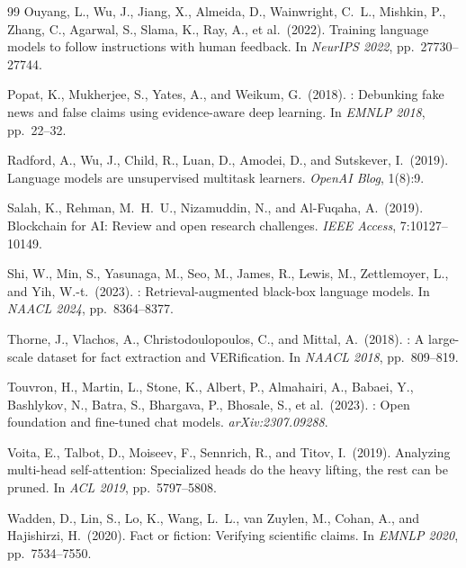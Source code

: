 \documentclass[11pt,a4paper]{article}
\begin{document}
\begin{thebibliography}{99}
Ouyang, L., Wu, J., Jiang, X., Almeida, D., Wainwright, C.~L., Mishkin, P.,
  Zhang, C., Agarwal, S., Slama, K., Ray, A., et al.\ (2022).
\newblock Training language models to follow instructions with human feedback.
\newblock In \textit{NeurIPS 2022}, pp.\ 27730--27744.

Popat, K., Mukherjee, S., Yates, A., and Weikum, G.\ (2018).
: Debunking fake news and false claims using evidence-aware
  deep learning.
\newblock In \textit{EMNLP 2018}, pp.\ 22--32.

Radford, A., Wu, J., Child, R., Luan, D., Amodei, D., and Sutskever, I.\ (2019).
\newblock Language models are unsupervised multitask learners.
\newblock \textit{OpenAI Blog}, 1(8):9.

Salah, K., Rehman, M.~H.~U., Nizamuddin, N., and Al-Fuqaha, A.\ (2019).
\newblock Blockchain for {AI}: Review and open research challenges.
\newblock \textit{IEEE Access}, 7:10127--10149.

Shi, W., Min, S., Yasunaga, M., Seo, M., James, R., Lewis, M., Zettlemoyer,
  L., and Yih, W.-t.\ (2023).
: Retrieval-augmented black-box language models.
\newblock In \textit{NAACL 2024}, pp.\ 8364--8377.

Thorne, J., Vlachos, A., Christodoulopoulos, C., and Mittal, A.\ (2018).
: A large-scale dataset for fact extraction and {VER}ification.
\newblock In \textit{NAACL 2018}, pp.\ 809--819.

Touvron, H., Martin, L., Stone, K., Albert, P., Almahairi, A., Babaei, Y.,
  Bashlykov, N., Batra, S., Bhargava, P., Bhosale, S., et al.\ (2023).
: Open foundation and fine-tuned chat models.
\newblock \textit{arXiv:2307.09288}.

Voita, E., Talbot, D., Moiseev, F., Sennrich, R., and Titov, I.\ (2019).
\newblock Analyzing multi-head self-attention: Specialized heads do the heavy
  lifting, the rest can be pruned.
\newblock In \textit{ACL 2019}, pp.\ 5797--5808.

Wadden, D., Lin, S., Lo, K., Wang, L.~L., van Zuylen, M., Cohan, A., and
  Hajishirzi, H.\ (2020).
\newblock Fact or fiction: Verifying scientific claims.
\newblock In \textit{EMNLP 2020}, pp.\ 7534--7550.


\end{thebibliography}
\end{document}

